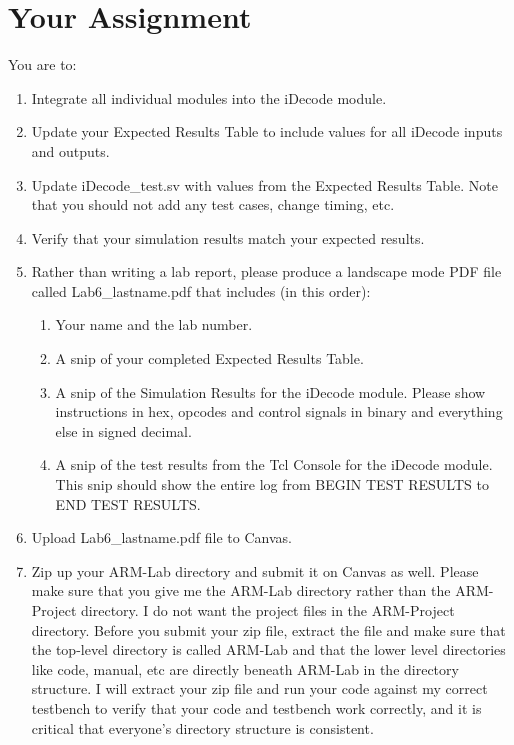 \section{Your Assignment}

You are to:
\begin{enumerate}
\item Integrate all individual modules into the iDecode module.
\item Update your Expected Results Table to include values for all iDecode inputs and outputs.
\item Update iDecode\_test.sv with values from the Expected Results Table.  Note that you should not add any test cases, change timing, etc.
\item Verify that your simulation results match your expected results.
\item Rather than writing a lab report, please produce a landscape mode PDF file called Lab6\_lastname.pdf that includes (in this order):
\begin{enumerate}
	\item Your name and the lab number.
	\item A snip of your completed Expected Results Table.
	\item A snip of the Simulation Results for the iDecode module.  Please show instructions in hex, opcodes and control signals in binary and everything else in signed decimal.  
	\item A snip of the test results from the Tcl Console for the iDecode module.  This snip should show the entire log from BEGIN TEST RESULTS to END TEST RESULTS.	
\end{enumerate}
\item Upload Lab6\_lastname.pdf file to Canvas.
\item Zip up your ARM-Lab directory and submit it on Canvas as well.  Please make sure that you give me the ARM-Lab directory rather than the ARM-Project directory.  I do not want the project files in the ARM-Project directory.  Before you submit your zip file, extract the file and make sure that the top-level directory is called ARM-Lab and that the lower level directories like code, manual, etc are directly beneath ARM-Lab in the directory structure.  I will extract your zip file and run your code against my correct testbench to verify that your code and testbench work correctly, and it is critical that everyone's directory structure is consistent.
\end{enumerate} 